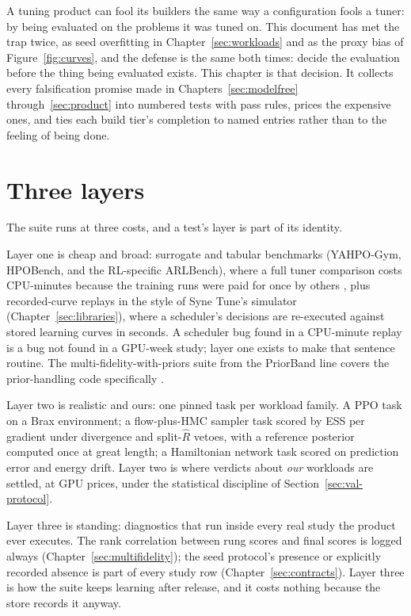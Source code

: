 A tuning product can fool its builders the same way a configuration
fools a tuner: by being evaluated on the problems it was tuned on.
This document has met the trap twice, as seed overfitting in
Chapter~\ref{sec:workloads} and as the proxy bias of
Figure~\ref{fig:curves}, and the defense is the same both times:
decide the evaluation before the thing being evaluated exists. This
chapter is that decision. It collects every falsification promise
made in Chapters~\ref{sec:modelfree} through~\ref{sec:product} into
numbered tests with pass rules, prices the expensive ones, and ties
each build tier's completion to named entries rather than to the
feeling of being done.

\section{Three layers}

The suite runs at three costs, and a test's layer is part of its
identity.

Layer one is cheap and broad: surrogate and tabular benchmarks
(YAHPO-Gym, HPOBench, and the RL-specific ARLBench), where a full
tuner comparison costs CPU-minutes because the training runs were
paid for once by others \citep{pfisterer2022yahpo,
eggensperger2021hpobench, becktepe2024arlbench}, plus recorded-curve
replays in the style of Syne Tune's simulator
(Chapter~\ref{sec:libraries}), where a scheduler's decisions are
re-executed against stored learning curves in seconds. A scheduler
bug found in a CPU-minute replay is a bug not found in a GPU-week
study; layer one exists to make that sentence routine. The
multi-fidelity-with-priors suite from the PriorBand line covers the
prior-handling code specifically \citep{mallik2023priorband}.

Layer two is realistic and ours: one pinned task per workload
family. A PPO task on a Brax environment; a flow-plus-HMC sampler
task scored by ESS per gradient under divergence and
split-$\widehat{R}$ vetoes, with a reference posterior computed once
at great length; a Hamiltonian network task scored on prediction
error and energy drift. Layer two is where verdicts about \emph{our}
workloads are settled, at GPU prices, under the statistical
discipline of Section~\ref{sec:val-protocol}.

Layer three is standing: diagnostics that run inside every real
study the product ever executes. The rank correlation between rung
scores and final scores is logged always
(Chapter~\ref{sec:multifidelity}); the seed protocol's presence or
explicitly recorded absence is part of every study row
(Chapter~\ref{sec:contracts}). Layer three is how the suite keeps
learning after release, and it costs nothing because the store
records it anyway.

